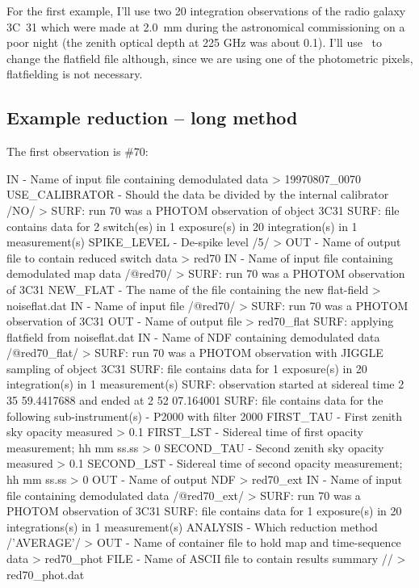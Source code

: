 \documentclass[twoside,11pt,fleqn,noabs]{starlink}
\providecommand{\task}[1]{\textsf{#1}}
\providecommand{\chgflat}{\xref{\task{change\_flat}}{sun216}{CHANGE_FLAT}}
\begin{document}
For the first example, I'll use two 20 integration observations of
the radio galaxy 3C~31 which were made at 2.0~mm during the
astronomical commissioning on a poor night (the zenith optical depth
at 225 GHz was about 0.1).  I'll use \chgflat\ to change the
flatfield file although, since we are using one of the photometric
pixels, flatfielding is not necessary.

\subsection{Example reduction -- long method\label{egred}}

The first observation is \#70:
\begin{small}
\begin{terminalv}
IN - Name of input file containing demodulated data > 19970807_0070
USE_CALIBRATOR - Should the data be divided by the internal calibrator /NO/ >
SURF: run 70 was a PHOTOM observation of object 3C31
SURF: file contains data for 2 switch(es) in 1 exposure(s) in 20 integration(s)
in 1 measurement(s)
SPIKE_LEVEL - De-spike level /5/ >
OUT - Name of output file to contain reduced switch data > red70
IN - Name of input file containing demodulated map data /@red70/ >
SURF: run 70 was a PHOTOM observation of 3C31
NEW_FLAT - The name of the file containing the new flat-field > noiseflat.dat
IN - Name of input file /@red70/ >
SURF: run 70 was a PHOTOM observation of 3C31
OUT - Name of output file > red70_flat
SURF: applying flatfield from noiseflat.dat
IN - Name of NDF containing demodulated data /@red70_flat/ >
SURF: run 70 was a PHOTOM observation with JIGGLE sampling of object 3C31
SURF: file contains data for 1 exposure(s) in 20 integration(s) in 1
measurement(s)
SURF: observation started at sidereal time 2 35 59.4417688 and ended at 2 52
07.164001
SURF: file contains data for the following sub-instrument(s)
 - P2000 with filter 2000
FIRST_TAU - First zenith sky opacity measured > 0.1
FIRST_LST - Sidereal time of first opacity measurement; hh mm ss.ss > 0
SECOND_TAU - Second zenith sky opacity measured > 0.1
SECOND_LST - Sidereal time of second opacity measurement; hh mm ss.ss > 0
OUT - Name of output NDF > red70_ext
IN - Name of input file containing demodulated data /@red70_ext/ >
SURF: run 70 was a PHOTOM observation of 3C31
SURF: file contains data for 1 exposure(s) in 20 integrations(s) in 1
measurement(s)
ANALYSIS - Which reduction method /'AVERAGE'/ >
OUT - Name of container file to hold map and time-sequence data > red70_phot
FILE - Name of ASCII file to contain results summary // > red70_phot.dat
\end{terminalv}
\end{small}
\end{document}
